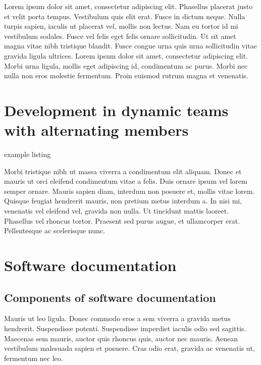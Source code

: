 Lorem ipsum dolor sit amet, consectetur adipiscing elit. Phasellus placerat
justo et velit porta tempus. Vestibulum quis elit erat. Fusce in dictum neque.
Nulla turpis sapien, iaculis ut placerat vel, mollis non lectus. Nam eu tortor
id mi vestibulum sodales. Fusce vel felis eget felis ornare sollicitudin. Ut
sit amet magna vitae nibh tristique blandit. Fusce congue urna quis urna
sollicitudin vitae gravida ligula ultrices. Lorem ipsum dolor sit amet,
consectetur adipiscing elit. Morbi urna ligula, mollis eget adipiscing id,
condimentum ac purus. Morbi nec nulla non eros molestie fermentum. Proin
euismod rutrum magna et venenatis. 


\newpage
\section{Development in dynamic teams with alternating members}

example listing


Morbi tristique nibh ut massa viverra a condimentum elit aliquam. Donec et
mauris ut orci eleifend condimentum vitae a felis. Duis ornare ipsum vel lorem
semper ornare. Mauris sapien diam, interdum non posuere et, mollis vitae
lorem. Quisque feugiat hendrerit mauris, non pretium metus interdum a. In nisi
mi, venenatis vel eleifend vel, gravida non nulla. Ut tincidunt mattis
laoreet. Phasellus vel rhoncus tortor. Praesent sed purus augue, et
ullamcorper erat. Pellentesque ac scelerisque nunc. 


 
\newpage
\section{Software documentation}
\FloatBarrier %


\subsection{Components of software documentation}
Mauris ut leo ligula. Donec commodo eros a sem viverra a gravida metus
hendrerit. Suspendisse potenti. Suspendisse imperdiet iaculis odio sed
sagittis. Maecenas sem mauris, auctor quis rhoncus quis, auctor nec mauris.
Aenean vestibulum malesuada sapien et posuere. Cras odio erat, gravida ac
venenatis ut, fermentum nec leo.

